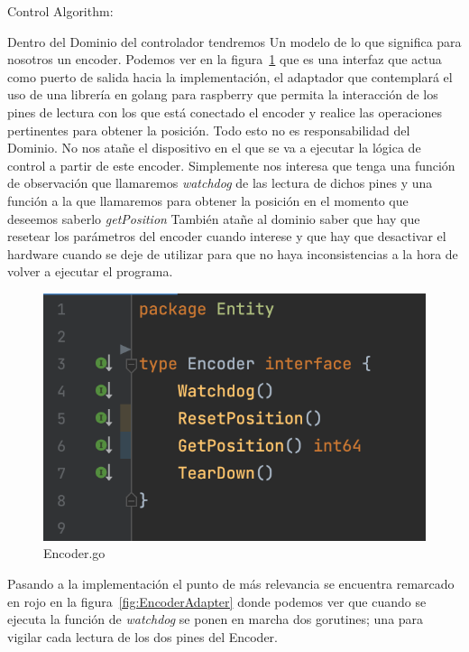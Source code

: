Control Algorithm:



Dentro del Dominio del controlador tendremos Un modelo de lo que significa para nosotros un encoder.
Podemos ver en la figura~\cref{fig:EncoderInterface} que es una interfaz que actua como puerto de salida hacia la implementación, el adaptador que contemplará el uso de una librería en golang para raspberry que permita la interacción de los pines de lectura con los que está conectado el encoder y realice las operaciones pertinentes para obtener la posición.
Todo esto no es responsabilidad del Dominio.
No nos atañe el dispositivo en el que se va a ejecutar la lógica de control a partir de este encoder.
Simplemente nos interesa que tenga una función de observación que llamaremos \textit{watchdog} de las lectura de dichos pines y una función a la que llamaremos para obtener la posición en el momento que deseemos saberlo \textit{getPosition} También atañe al dominio saber que hay que resetear los parámetros del encoder cuando interese y que hay que desactivar el hardware cuando se deje de utilizar para que no haya inconsistencias a la hora de volver a ejecutar el programa.


\begin{figure}[H]
    \centering
    \includegraphics[height=0.2\textheight]{./part/Ejecucion/Seguimiento/PidControl/img/EncoderInterface}
    \caption{Encoder.go}\label{fig:EncoderInterface}
\end{figure}

Pasando a la implementación el punto de más relevancia se encuentra remarcado en rojo en la figura~\cref{fig:EncoderAdapter} donde podemos ver que cuando se ejecuta la función de \textit{watchdog} se ponen en marcha dos gorutines; una para vigilar cada lectura de los dos pines del Encoder.

